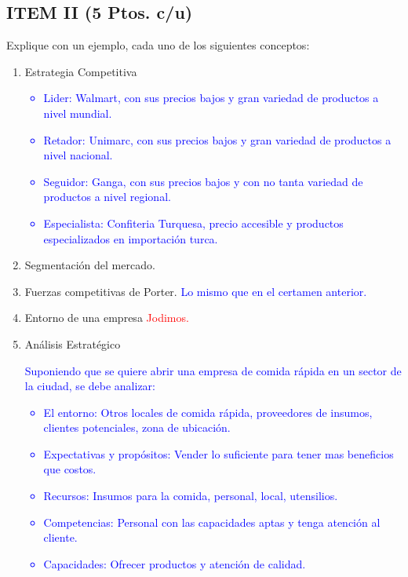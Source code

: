 \documentclass{templateNote}
\begin{document}
\subsection*{ITEM II (5 Ptos. c/u)}
Explique con un ejemplo, cada uno de los siguientes conceptos:
\begin{enumerate}
    \item Estrategia Competitiva
    \textcolor{blue}{
        \begin{itemize}
            \item Lider: Walmart, con sus precios bajos y gran variedad de productos a nivel mundial.
            \item Retador: Unimarc, con sus precios bajos y gran variedad de productos a nivel nacional.
            \item Seguidor: Ganga, con sus precios bajos y con no tanta variedad de productos a nivel regional.
            \item Especialista: Confiteria Turquesa, precio accesible y productos especializados en importación turca.
        \end{itemize}
    }
    
    \item Segmentación del mercado.
    
    \item Fuerzas competitivas de Porter.\newline
    \textcolor{blue}{
        Lo mismo que en el certamen anterior.
    }
    
    \item Entorno de una empresa
    \textcolor{red}{
        Jodimos.
    }
    
    \item Análisis Estratégico\newline
    \textcolor{blue}{
        Suponiendo que se quiere abrir una empresa de comida rápida en un sector de la ciudad, se debe analizar:
        \begin{itemize}
            \item El entorno: Otros locales de comida rápida, proveedores de insumos, clientes potenciales, zona de ubicación.
            \item Expectativas y propósitos: Vender lo suficiente para tener mas beneficios que costos.
            \item Recursos: Insumos para la comida, personal, local, utensilios.
            \item Competencias: Personal con las capacidades aptas y tenga atención al cliente.
            \item Capacidades: Ofrecer productos y atención de calidad.
        \end{itemize}
    }
\end{enumerate}
\end{document}
